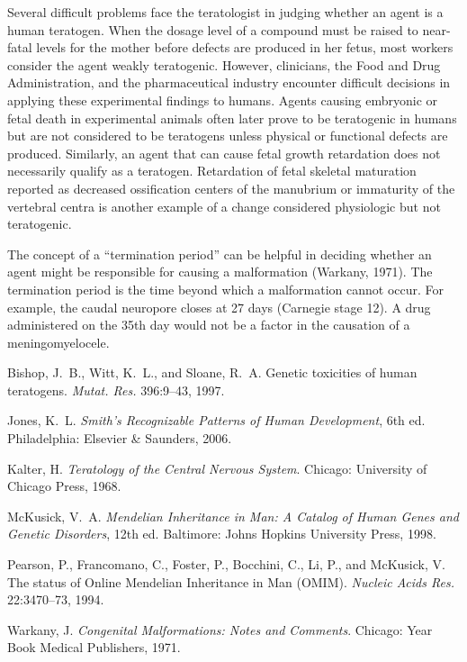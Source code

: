 Several difficult problems face the teratologist in judging whether
an agent is a human teratogen. When the dosage level of a compound
must be raised to near-fatal levels for the mother before defects are
produced in her fetus, most workers consider the agent weakly
teratogenic. However, clinicians, the Food and Drug Administration,
and the pharmaceutical industry encounter difficult decisions in
applying these experimental findings to humans. Agents causing
embryonic or fetal death in experimental animals often later prove to
be teratogenic in humans but are not considered to be teratogens
unless physical or functional defects are produced. Similarly, an
agent that can cause fetal growth retardation does not necessarily
qualify as a teratogen. Retardation of fetal skeletal maturation
reported as decreased ossification centers of the manubrium or
immaturity of the vertebral centra is another example of a change
considered physiologic but not teratogenic.

The concept of a ``termination period'' can be helpful in deciding
whether an agent might be responsible for causing a malformation
(Warkany, 1971).  The termination period is the time beyond which a
malformation cannot occur.  For example, the caudal neuropore closes
at 27 days (Carnegie stage 12).  A drug administered on the 35th day
would not be a factor in the causation of a meningomyelocele.

\vspace{2pc}

\begin{references}

\item Bishop, J.~B., Witt, K.~L., and Sloane, R.~A.
Genetic toxicities of human teratogens. {\it Mutat. Res.}
 396:9--43, 1997.
\item Jones, K.~L. {\it Smith's 
Recognizable Patterns of Human Development}, 6th ed. Philadelphia:
Elsevier \& Saunders, 2006.
\item Kalter, H.
{\it Teratology of the Central Nervous System}.
Chicago: University of Chicago Press, 1968.
\item McKusick, V.~A. {\it Mendelian Inheritance in Man:
A Catalog of Human Genes and Genetic Disorders}, 
12th ed. Baltimore:
Johns Hopkins University Press, 1998.
\item Pearson, P., Francomano, C., Foster, P.,
 Bocchini, C., Li, P., and McKusick, V.
 The status of Online Mendelian Inheritance in Man (OMIM).
 {\it Nucleic Acids Res.} 22:3470--73, 1994.
\item Warkany, J. {\it Congenital Malformations: Notes and Comments}.
Chicago: Year Book Medical Publishers, 1971.
\end{references}


